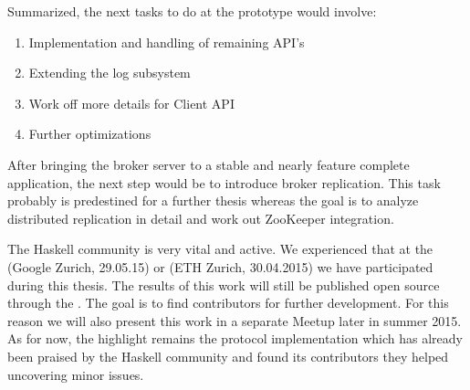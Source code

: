 Summarized, the next tasks to do at the prototype would involve:
\begin{enumerate}
    \item Implementation and handling of remaining API's
    \item Extending the log subsystem
    \item Work off more details for Client API
    \item Further optimizations
\end{enumerate}

After bringing the broker server to a stable and nearly feature complete
application, the next step would be to introduce broker replication. This task
probably is predestined for a further thesis whereas the goal is to analyze
distributed replication in detail and work out ZooKeeper
integration.

The Haskell community is very vital and active. We experienced that at the
 (Google Zurich,
29.05.15) or 
(ETH Zurich, 30.04.2015) we have participated during this thesis. The results
of this work will still be published open source through the . The goal is to find contributors for
further development. For this reason we will also present this work in a
separate Meetup later in summer 2015. As for now, the highlight remains the
protocol implementation which has already been praised by the Haskell community
and found its contributors they helped uncovering minor issues.

